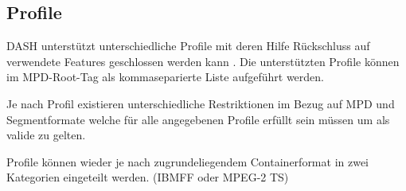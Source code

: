 \documentclass[paper = a4, fontsize = 12pt, parskip = half]{scrartcl} %
\begin{document}
\subsection{Profile}
\label{profiles}
DASH unterstützt unterschiedliche Profile mit deren Hilfe Rückschluss auf verwendete Features geschlossen werden kann \cite{international_organization_for_standardization_isoiec_nodate}. Die unterstützten Profile können im MPD-Root-Tag als kommaseparierte Liste aufgeführt werden.

Je nach Profil existieren unterschiedliche Restriktionen im Bezug auf MPD und Segmentformate welche für alle angegebenen Profile erfüllt sein müssen um als valide zu gelten.

Profile können wieder je nach zugrundeliegendem Containerformat in zwei Kategorien eingeteilt werden. (IBMFF oder MPEG-2 TS)
\end{document}
